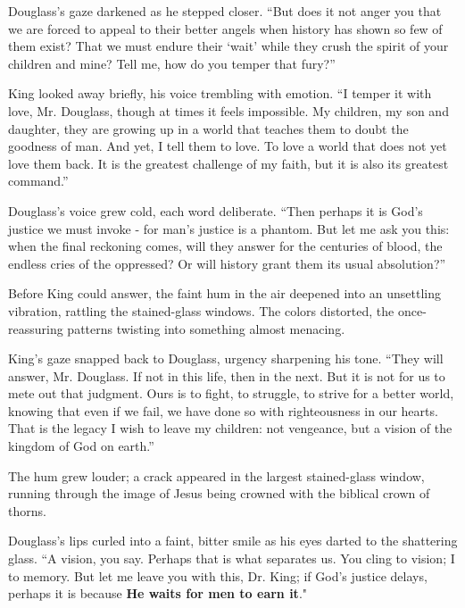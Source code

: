 \documentclass[12pt]{article}
\begin{document}
Douglass’s gaze darkened as he stepped closer. {\color{douglasscolor}``But does it not anger you that we are forced to appeal to their better angels when history has shown so few of them exist? That we must endure their `wait' while they crush the spirit of your children and mine? Tell me, how do you temper that fury?''}

King looked away briefly, his voice trembling with emotion. {\color{kingcolor}``I temper it with love, Mr. Douglass, though at times it feels impossible. My children, my son and daughter, they are growing up in a world that teaches them to doubt the goodness of man. And yet, I tell them to love. To love a world that does not yet love them back. It is the greatest challenge of my faith, but it is also its greatest command.''}

Douglass’s voice grew cold, each word deliberate. {\color{douglasscolor}``Then perhaps it is God’s justice we must invoke - for man’s justice is a phantom. But let me ask you this: when the final reckoning comes, will they answer for the centuries of blood, the endless cries of the oppressed? Or will history grant them its usual absolution?''}

Before King could answer, the faint hum in the air deepened into an unsettling vibration, rattling the stained-glass windows. The colors distorted, the once-reassuring patterns twisting into something almost menacing. 

King’s gaze snapped back to Douglass, urgency sharpening his tone. {\color{kingcolor}``They will answer, Mr. Douglass. If not in this life, then in the next. But it is not for us to mete out that judgment. Ours is to fight, to struggle, to strive for a better world, knowing that even if we fail, we have done so with righteousness in our hearts. That is the legacy I wish to leave my children: not vengeance, but a vision of the kingdom of God on earth.''}

The hum grew louder; a crack appeared in the largest stained-glass window, running through the image of Jesus being crowned with the biblical crown of thorns.

Douglass’s lips curled into a faint, bitter smile as his eyes darted to the shattering glass. {\color{douglasscolor} ``A vision, you say. Perhaps that is what separates us. You cling to vision; I to memory. But let me leave you with this, Dr. King; if God’s justice delays, perhaps it is because \textbf{He waits for men to earn it}."}


\printbibliography
\end{document}
